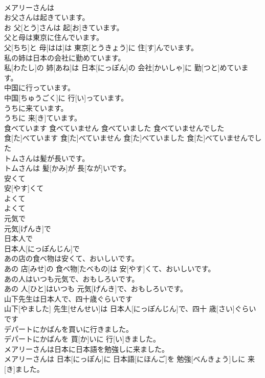 \documentclass[8pt]{extreport}
\begin{document}
\begin{CJK}{UTF8}{min}
\\	メアリーさんは	
\\	お父さんは起きています。	
\\	お 父[とう]さんは 起[お]きています。	
\\	父と母は東京に住んでいます。	
\\	父[ちち]と 母[はは]は 東京[とうきょう]に 住[す]んでいます。	
\\	私の姉は日本の会社に勤めています。	
\\	私[わたし]の 姉[あね]は 日本[にっぽん]の 会社[かいしゃ]に 勤[つと]めています。	
\\	中国に行っています。	
\\	中国[ちゅうごく]に 行[い]っています。	
\\	うちに来ています。	
\\	うちに 来[き]ています。	
\\	食べています 食べていません 食べていました 食べていませんでした	
\\	食[た]べています 食[た]べていません 食[た]べていました 食[た]べていませんでした	
\\	トムさんは髪が長いです。	
\\	トムさんは 髪[かみ]が 長[なが]いです。	
\\	安くて	
\\	安[やす]くて	
\\	よくて	
\\	よくて	
\\	元気で	
\\	元気[げんき]で	
\\	日本人で	
\\	日本人[にっぽんじん]で	
\\	あの店の食べ物は安くて、おいしいです。	
\\	あの 店[みせ]の 食べ物[たべもの]は 安[やす]くて、おいしいです。	
\\	あの人はいつも元気で、おもしろいです。	
\\	あの 人[ひと]はいつも 元気[げんき]で、おもしろいです。	
\\	山下先生は日本人で、四十歳ぐらいです	
\\	山下[やました] 先生[せんせい]は 日本人[にっぽんじん]で、四十 歳[さい]ぐらいです	
\\	デパートにかばんを買いに行きました。	
\\	デパートにかばんを 買[か]いに 行[い]きました。	
\\	メアリーさんは日本に日本語を勉強しに来ました。	
\\	メアリーさんは 日本[にっぽん]に 日本語[にほんご]を 勉強[べんきょう]しに 来[き]ました。	

\end{CJK}
\end{document}
